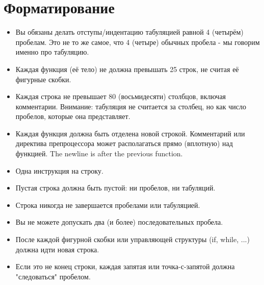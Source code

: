 \documentclass{42-ru}
\begin{document}
    \section{Форматирование}

            \begin{itemize}

                \item Вы обязаны делать отступы/индентацию табуляцией равной 4 (четырём) пробелам.
                    Это не то же самое, что 4 (четыре) обычных пробела - мы говорим именно про табуляцию.

                \item Каждая функция (её тело) не должна превышать 25 строк, не считая её фигурные скобки.

                \item Каждая строка не превышает 80 (восьмидесяти) столбцов, включая комментарии.
                    Внимание: табуляция не считается за столбец, но как число пробелов, которые она представляет.

                \item Каждая функция должна быть отделена новой строкой. Комментарий или директива препроцессора
                    может располагаться прямо (вплотную) над функцией. The newline is after the previous function.

                \item Одна инструкция на строку.

                \item Пустая строка должна быть пустой: ни пробелов, ни табуляций.

                \item Строка никогда не завершается пробелами или табуляцией.

                \item Вы не можете допускать два (и более) последовательных пробела.

                \item После каждой фигурной скобки или управляющей структуры (if, while, ...) должна идти новая строка.

                \item Если это не конец строки, каждая запятая или точка-с-запятой должна "следоваться" пробелом.


\end{itemize}
\end{document}
